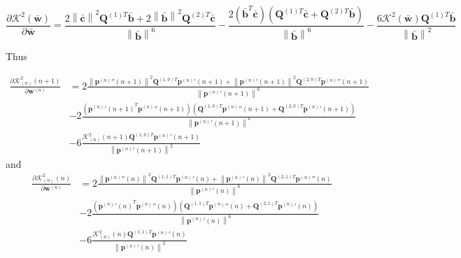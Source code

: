 \small
\begin{equation}
\frac{
\partial 
\mathcal{K}^{2}(\mathbf{\bar{w}})
}
{
\partial \mathbf{\bar{w}}
}
=
\frac{
2
\left\|\mathbf{\bar{c}}\right\|^2
\mathbf{Q}^{(1)T} \mathbf{\bar{b}}
+
2
\left\|\mathbf{\bar{b}}\right\|^2
\mathbf{Q}^{(2)T} \mathbf{\bar{c}}
}
{\left\| \mathbf{\bar{b}} \right\|^{6}}
-
\frac
{
2
\left(
\mathbf{\bar{b}}^{T}
\mathbf{\bar{c}}
\right)
\left(
\mathbf{Q}^{(1)T}\mathbf{\bar{c}}
+
\mathbf{Q}^{(2)T}\mathbf{\bar{b}}
\right)
}
{\left\| \mathbf{\bar{b}} \right\|^{6}}
-
\frac
{
6
\mathcal{K}^{2}(\mathbf{\bar{w}})
\mathbf{Q}^{(1)T}\mathbf{\bar{b}}
}
{\left\| \mathbf{\bar{b}} \right\|^{2}}
\end{equation}
\normalsize

Thus


\begin{equation}
\begin{split}
\frac{
\partial 
\mathcal{K}_{(n)}^{2}(n+1)
}
{
\partial \mathbf{w}^{(n)}
}
& = 
2
\frac{
\left\|{\mathbf{p}^{(n)}}''(n+1)\right\|^2
\mathbf{Q}^{(1,0)T} {\mathbf{p}^{(n)}}'(n+1)
+
\left\|{\mathbf{p}^{(n)}}'(n+1)\right\|^2
\mathbf{Q}^{(2,0)T} {\mathbf{p}^{(n)}}''(n+1)
}
{\left\| {\mathbf{p}^{(n)}}'(n+1) \right\|^{6}}\\[10pt]
& - 
2
\frac
{
\left(
{{\mathbf{p}^{(n)}}'(n+1)}^{T}
{\mathbf{p}^{(n)}}''(n+1)
\right)
\left(
\mathbf{Q}^{(1,0)T}{\mathbf{p}^{(n)}}''(n+1)
+
\mathbf{Q}^{(2,0)T}{\mathbf{p}^{(n)}}'(n+1)
\right)
}
{\left\| {\mathbf{p}^{(n)}}'(n+1) \right\|^{6}}\\[10pt]
& - 
6
\frac
{
\mathcal{K}_{(n)}^{2}(n+1)
\mathbf{Q}^{(1,0)T}{\mathbf{p}^{(n)}}'(n+1)
}
{\left\| {\mathbf{p}^{(n)}}'(n+1) \right\|^{2}}
\end{split}
\end{equation}
and
\begin{equation}
\begin{split}
\frac{
\partial 
\mathcal{K}_{(n)}^{2}(n)
}
{
\partial \mathbf{w}^{(n)}
}
& = 
2
\frac{
\left\|{\mathbf{p}^{(n)}}''(n)\right\|^2
\mathbf{Q}^{(1,1)T} {\mathbf{p}^{(n)}}'(n)
+
\left\|{\mathbf{p}^{(n)}}'(n)\right\|^2
\mathbf{Q}^{(2,1)T} {\mathbf{p}^{(n)}}''(n)
}
{\left\| {\mathbf{p}^{(n)}}'(n) \right\|^{6}}\\[10pt]
& - 
2
\frac
{
\left(
{{\mathbf{p}^{(n)}}'(n)}^{T}
{\mathbf{p}^{(n)}}''(n)
\right)
\left(
\mathbf{Q}^{(1,1)T}{\mathbf{p}^{(n)}}''(n)
+
\mathbf{Q}^{(2,1)T}{\mathbf{p}^{(n)}}'(n)
\right)
}
{\left\| {\mathbf{p}^{(n)}}'(n) \right\|^{6}}\\[10pt]
& - 
6
\frac
{
\mathcal{K}_{(n)}^{2}(n)
\mathbf{Q}^{(1,1)T}{\mathbf{p}^{(n)}}'(n)
}
{\left\| {\mathbf{p}^{(n)}}'(n) \right\|^{2}}
\end{split}
\end{equation}


\begin{comment}
Finally

\begin{equation}
\frac{
\partial 
\mathcal{K}_{(n)}^{2}(n+1)
}
{
\partial \mathbf{w}^{(n)}
}
\end{equation}
\end{comment}
